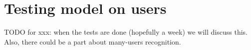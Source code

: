 
\chapter{Testing model on users}

TODO for xxx: when the tests are done (hopefully a week) we will discuss this. Also, there could be a part about many-users recognition.